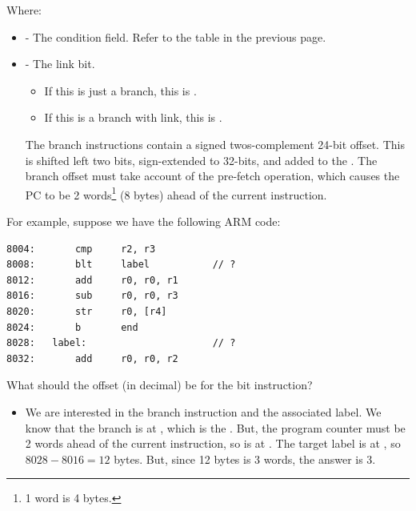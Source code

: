 \documentclass[letterpaper]{article}
\begin{document}
Where: 
\begin{itemize}
    \item {} - The condition field. Refer to the table in the previous page. 
    \item {} - The link bit. 
    \begin{itemize}
        \item If this is just a branch, this is .
        \item If this is a branch with link, this is . 
    \end{itemize}
    The branch instructions contain a signed twos-complement 24-bit offset. This is shifted left two bits, sign-extended to 32-bits, and added to the . The branch offset must take account of the pre-fetch operation, which causes the PC to be 2 words\footnote{1 word is 4 bytes.} (8 bytes) ahead of the current instruction. 
\end{itemize}

For example, suppose we have the following ARM code:
\begin{verbatim}
8004:       cmp     r2, r3 
8008:       blt     label           // ?
8012:       add     r0, r0, r1 
8016:       sub     r0, r0, r3 
8020:       str     r0, [r4]
8024:       b       end 
8028:   label:                      // ?
8032:       add     r0, r0, r2  
\end{verbatim}
What should the offset (in decimal) be for the bit instruction?

\begin{itemize}
    \item We are interested in the branch instruction and the associated label. We know that the branch is at , which is the . But, the program counter must be 2 words ahead of the current instruction, so  is at . The target label is at , so $8028 - 8016 = 12$ bytes. But, since 12 bytes is 3 words, the answer is 3. 
\end{itemize}
\end{document}
